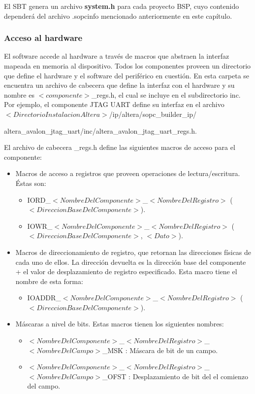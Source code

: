 El SBT genera un archivo \textbf{system.h} para cada proyecto BSP, cuyo contenido dependerá del archivo .sopcinfo mencionado anteriormente en este capítulo.

\subsubsection{Acceso al hardware}
El software accede al hardware a través de macros que abstraen la interfaz mapeada en memoria al dispositivo. Todos los componentes proveen un directorio que define el hardware y el software del periférico en cuestión. En esta carpeta se encuentra un archivo de cabecera que define la interfaz con el hardware y su nombre es $<componente>$\_regs.h, el cual se incluye en el subdirectorio inc. Por ejemplo, el componente JTAG UART define su interfaz en el archivo $<Directorio Instalacion Altera>$/ip/altera/sopc\_builder\_ip/

altera\_avalon\_jtag\_uart/inc/altera\_avalon\_jtag\_uart\_regs.h.

El archivo de cabecera \_regs.h define las siguientes macros de acceso para el componente:
\begin{itemize}
	\item Macros de acceso a registros que proveen operaciones de lectura/escritura. Éstas son:
	\begin{itemize}
		\item IORD\_$<NombreDelComponente>$\_$<NombreDelRegistro>$ ($<DireccionBaseDelComponente>$).
		\item IOWR\_$<NombreDelComponente>$\_$<NombreDelRegistro>$ ($<DireccionBaseDelComponente>$, $<Dato>$).
	\end{itemize}
	\item Macros de direccionamiento de registro, que retornan las direcciones físicas de cada uno de ellos. La dirección devuelta es la dirección base del componente + el valor de desplazamiento de registro especificado. Esta macro tiene el nombre de esta forma:
	\begin{itemize}
		\item IOADDR\_$<NombreDelComponente>$\_$<NombreDelRegistro>$ ($<DireccionBaseDelComponente>$).
	\end{itemize}
	\item Máscaras a nivel de bits. Estas macros tienen los siguientes nombres:
	\begin{itemize}
		\item $<NombreDelComponente>$\_$<NombreDelRegistro>$\_$<NombreDelCampo>$\_MSK : Máscara de bit de un campo.
		\item $<NombreDelComponente>$\_$<NombreDelRegistro>$\_$<NombreDelCampo>$\_OFST : Desplazamiento de bit del el comienzo del campo.
	\end{itemize}
\end{itemize}

